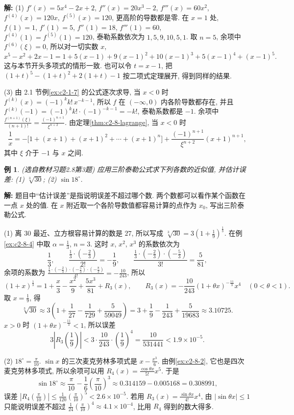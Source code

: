 \documentclass[UTF8,openany]{ctexbook}
\theoremstyle{chinesetextbook}
\newtheorem{example}{例}[section]
\newenvironment{cnsolution}{\par\indent\textbf{解:} \ignorespaces}{\par}
\begin{document}
\begin{cnsolution}
(1) $f'(x)=5x^4-2x+2$, $f''(x)=20x^3-2$, $f'''(x)=60x^2$, $f^{(4)}(x)=120x$, $f^{(5)}(x)=120$, 更高阶的导数都是零. 在 $x=1$ 处, $f(1)=1$, $f'(1)=5$, $f''(1)=18$, $f'''(1)=60$, $f^{(4)}(1)=f^{(5)}(1)=120$, 泰勒系数依次为 $1,5,9,10,5,1$. 取 $n=5$, 余项中 $f^{(6)}(\xi)=0$, 所以对一切实数 $x$,
\[
x^5-x^2+2x-1=1+5(x-1)+9(x-1)^2+10(x-1)^3+5(x-1)^4+(x-1)^5.
\]
这与本节开头多项式的情形一致. 也可以令 $t=x-1$, 把 $(1+t)^5-(1+t)^2+2(1+t)-1$ 按二项式定理展开, 得到同样的结果.

(3) 由 2.1 节例\ref{ex:c2-1-7} 的公式逐次求导, 当 $x<0$ 时 $f^{(k)}(x)=(-1)^kk!\,x^{-k-1}$, 所以 $f$ 在 $(-\infty,0)$ 内各阶导数都存在, 并且 $f^{(k)}(-1)=(-1)^kk!\cdot(-1)^{-k-1}=-k!$, 泰勒系数都是 $-1$. 余项中 $\displaystyle\frac{f^{(n+1)}(\xi)}{(n+1)!}=\frac{(-1)^{n+1}}{\xi^{n+2}}$. 由定理\ref{thm:c2-8-lagrange}, 当 $x<0$ 时
\[
\frac1x=-\bigl[1+(x+1)+(x+1)^2+\cdots+(x+1)^n\bigr]+\frac{(-1)^{n+1}}{\xi^{n+2}}(x+1)^{n+1},
\]
其中 $\xi$ 介于 $-1$ 与 $x$ 之间.
\end{cnsolution}
\begin{example}\label{ex:c2-h8-3}
\textnormal{(选自教材习题2.8第3题)} 应用三阶泰勒公式求下列各数的近似值, 并估计误差: (1) $\sqrt[3]{30}$; (2) $\sin18^\circ$.
\end{example}
\begin{cnsolution}
题目中“估计误差”是指说明误差不超过哪个数. 两个数都可以看作某个函数在一点 $x$ 处的值. 在 $x$ 附近取一个各阶导数值都容易计算的点作为 $x_0$, 写出三阶泰勒公式.

(1) 离 $30$ 最近、立方根容易计算的数是 $27$, 所以写成 $\displaystyle\sqrt[3]{30}=3\left(1+\frac19\right)^{\frac13}$. 在例\ref{ex:c2-8-4} 中取 $\displaystyle\alpha=\frac13$, $n=3$. 这时 $x$, $x^2$, $x^3$ 的系数依次为
\[
\frac13,\qquad\frac{\frac13\cdot\left(-\frac23\right)}{2!}=-\frac19,\qquad\frac{\frac13\cdot\left(-\frac23\right)\cdot\left(-\frac53\right)}{3!}=\frac5{81},
\]
余项的系数为 $\displaystyle\frac{\frac13\cdot\left(-\frac23\right)\cdot\left(-\frac53\right)\cdot\left(-\frac83\right)}{4!}=-\frac{10}{243}$, 所以
\[
(1+x)^{\frac13}=1+\frac x3-\frac{x^2}9+\frac{5x^3}{81}+R_3(x),\qquad R_3(x)=-\frac{10}{243}(1+\theta x)^{-\frac{11}3}x^4\quad(0<\theta<1).
\]
取 $\displaystyle x=\frac19$, 得
\[
\sqrt[3]{30}\approx3\left(1+\frac1{27}-\frac1{729}+\frac5{59049}\right)=3+\frac19-\frac1{243}+\frac5{19683}\approx3.10725.
\]
$x>0$ 时 $(1+\theta x)^{-\frac{11}3}<1$, 所以误差
\[
3\left|R_3\left(\frac19\right)\right|<3\cdot\frac{10}{243}\cdot\left(\frac19\right)^4=\frac{10}{531441}<1.9\times10^{-5}.
\]

(2) $\displaystyle18^\circ=\frac\pi{10}$. $\sin x$ 的三次麦克劳林多项式是 $\displaystyle x-\frac{x^3}6$. 由例\ref{ex:c2-8-2}, 它也是四次麦克劳林多项式, 所以余项可以用 $\displaystyle R_4(x)=\frac{\cos\theta x}{5!}x^5$. 于是
\[
\sin18^\circ\approx\frac\pi{10}-\frac16\left(\frac\pi{10}\right)^3\approx0.314159-0.005168=0.308991,
\]
误差 $\displaystyle\left|R_4\left(\frac\pi{10}\right)\right|\le\frac1{120}\left(\frac\pi{10}\right)^5<2.6\times10^{-5}$. 若用 $\displaystyle R_3(x)=\frac{\sin\theta x}{4!}x^4$, 由 $|\sin\theta x|\le1$ 只能说明误差不超过 $\displaystyle\frac1{24}\left(\frac\pi{10}\right)^4\approx4.1\times10^{-4}$, 比用 $R_4$ 得到的数大得多.
\end{cnsolution}
\end{document}
